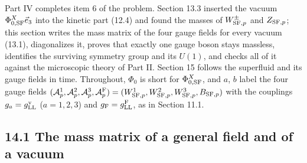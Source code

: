 \documentclass[
  10pt,
]{article}
\begin{document}
Part IV completes item 6 of the problem. Section 13.3 inserted the
vacuum \(\Phi^X_{0,{\rm SF}}\vec e_3\) into the kinetic part (12.4) and
found the masses of \(W^\pm_{{\rm SF},p}\) and \(Z_{{\rm SF},p}\); this
section writes the mass matrix of the four gauge fields for every vacuum
(13.1), diagonalizes it, proves that exactly one gauge boson stays
massless, identifies the surviving symmetry group and its \(U(1)\), and
checks all of it against the microscopic theory of Part II. Section 15
follows the superfluid and its gauge fields in time. Throughout,
\(\Phi_0\) is short for \(\Phi^X_{0,{\rm SF}}\), and \(a\), \(b\) label
the four gauge fields
\((\mathcal A^1_p,\mathcal A^2_p,\mathcal A^3_p,\mathcal A^{\rm F}_p)=(W^1_{{\rm SF},p},W^2_{{\rm SF},p},W^3_{{\rm SF},p},B_{{\rm SF},p})\)
with the couplings \(g_a=g^{\rm v}_{\rm LL}\) (\(a=1,2,3\)) and
\(g_{\rm F}=g^{\rm F}_{\rm LL}\), as in Section 11.1.

\hypertarget{the-mass-matrix-of-a-general-field-and-of-a-vacuum}{%
\subsection{14.1 The mass matrix of a general field and of a
vacuum}\label{the-mass-matrix-of-a-general-field-and-of-a-vacuum}}
\end{document}
